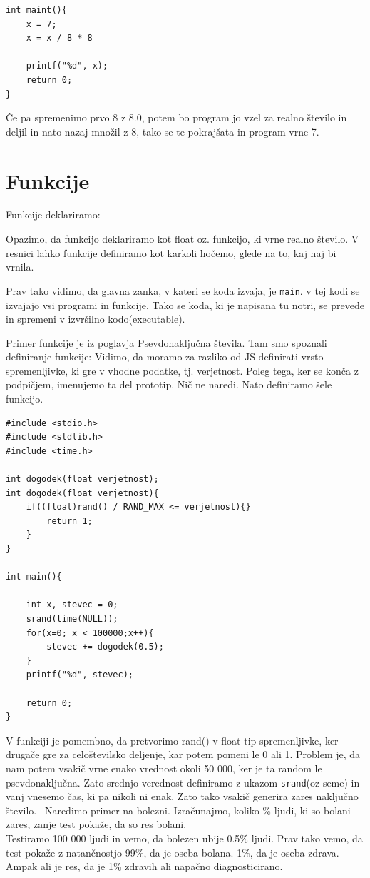 \documentclass[a4paper, 12pt]{article}
\begin{document}
\begin{lstlisting}
int maint(){	
	x = 7;
	x = x / 8 * 8
	
	printf("%d", x);
	return 0;
}
\end{lstlisting}
Če pa spremenimo prvo 8 z 8.0, potem bo program jo vzel za realno število in deljil in nato nazaj množil z 8, tako se te pokrajšata in program vrne 7.
\section{Funkcije}

Funkcije deklariramo:\

{\centering{}\par}

Opazimo, da funkcijo deklariramo kot float oz. funkcijo, ki vrne realno število. V resnici lahko funkcije definiramo kot karkoli hočemo, glede na to, kaj naj bi vrnila.\

Prav tako vidimo, da glavna zanka, v kateri se koda izvaja, je \texttt{main}. v tej kodi se izvajajo vsi programi in funkcije. Tako se koda, ki je napisana tu notri, se prevede in spremeni v izvršilno kodo(executable).\

Primer funkcije je iz poglavja Psevdonaključna števila. Tam smo spoznali definiranje funkcije:
 Vidimo, da moramo za razliko od JS definirati vrsto spremenljivke, ki gre v vhodne podatke, tj. verjetnost. Poleg tega, ker se konča z podpičjem, imenujemo ta del prototip. Nič ne naredi. Nato definiramo šele funkcijo.

\begin{lstlisting}
#include <stdio.h>
#include <stdlib.h>
#include <time.h>

int dogodek(float verjetnost);
int dogodek(float verjetnost){
	if((float)rand() / RAND_MAX <= verjetnost){}
		return 1;
	}
}

int main(){

	int x, stevec = 0;
	srand(time(NULL));
	for(x=0; x < 100000;x++){
		stevec += dogodek(0.5);
	}
	printf("%d", stevec);

	return 0;
}
\end{lstlisting}

V funkciji je pomembno, da pretvorimo rand() v float tip spremenljivke, ker drugače gre za celoštevilsko deljenje, kar potem pomeni le 0 ali 1. Problem je, da nam potem vsakič vrne enako vrednost okoli 50 000, ker je ta random le psevdonaključna. Zato srednjo verednost definiramo z ukazom \texttt{srand}(oz seme) in vanj vnesemo čas, ki pa nikoli ni enak. Zato tako vsakič generira zares naključno število.\
\pagebreak
Naredimo primer na bolezni. Izračunajmo, koliko \% ljudi, ki so bolani zares, zanje test pokaže, da so res bolani.\\
Testiramo 100 000 ljudi in vemo, da bolezen ubije 0.5\% ljudi. Prav tako vemo, da test pokaže z natančnostjo 99\%, da je oseba bolana. 1\%, da je oseba zdrava. Ampak ali je res, da je 1\% zdravih ali napačno diagnosticirano.
\end{document}
